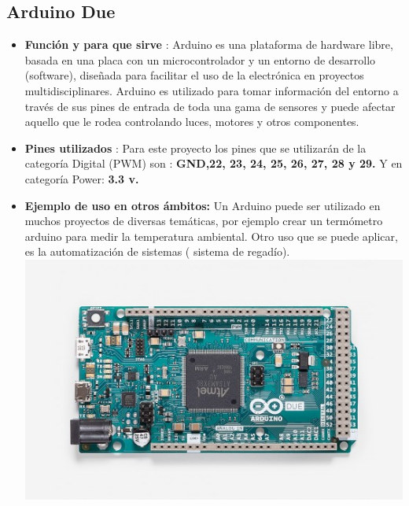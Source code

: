 \documentclass[12pt]{article}
\begin{document}
    \subsection{Arduino Due }
    \begin{itemize}
        \item \textbf{Función y para que sirve }: Arduino es una plataforma de hardware libre, basada en una placa con un microcontrolador y un entorno de desarrollo (software), diseñada para facilitar el uso de la electrónica en proyectos multidisciplinares. Arduino es utilizado para tomar información del entorno a través de sus pines de entrada de toda una gama de sensores y puede afectar aquello que le rodea controlando luces, motores y otros componentes.
        \item \textbf{Pines utilizados }: Para este proyecto los pines que se utilizarán de la categoría Digital (PWM) son : \textbf{GND,22, 23, 24, 25, 26, 27, 28 y 29.} Y en categoría Power:\textbf{ 3.3 v.}
        \item\textbf{Ejemplo de uso en otros ámbitos: }Un Arduino puede ser utilizado en muchos proyectos de diversas temáticas, por ejemplo crear un termómetro arduino para medir la temperatura ambiental. Otro uso que se puede aplicar, es la automatización de sistemas ( sistema de regadío).
        \newline
        \includegraphics[scale = 1]{due.png}\\[1.0 cm]
    \end{itemize}{}
\end{document}
